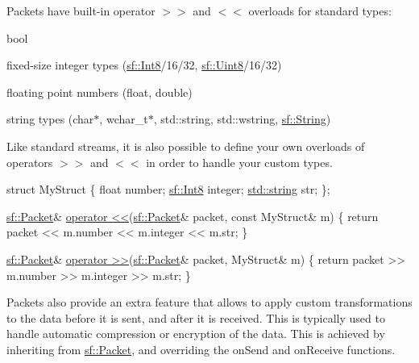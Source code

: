 Packets have built-\/in operator $>$$>$ and $<$$<$ overloads for standard types\-: \begin{DoxyItemize}
\item bool \item fixed-\/size integer types (\hyperlink{namespacesf_a69b109973eac74e22b97e5339bdb68dd}{sf\-::\-Int8}/16/32, \hyperlink{namespacesf_a4ef3d630785c4f296f9b4f274c33d78e}{sf\-::\-Uint8}/16/32) \item floating point numbers (float, double) \item string types (char$\ast$, wchar\-\_\-t$\ast$, std\-::string, std\-::wstring, \hyperlink{classsf_1_1_string}{sf\-::\-String})\end{DoxyItemize}
Like standard streams, it is also possible to define your own overloads of operators $>$$>$ and $<$$<$ in order to handle your custom types.


\begin{DoxyCode}
\textcolor{keyword}{struct }MyStruct
\{
    \textcolor{keywordtype}{float}       number;
    \hyperlink{namespacesf_a69b109973eac74e22b97e5339bdb68dd}{sf::Int8}    integer;
    \hyperlink{gl3_8h_ac83513893df92266f79a515488701770}{std::string} str;
\};

\hyperlink{classsf_1_1_packet}{sf::Packet}& \hyperlink{classsf_1_1_packet_aa5a465ed02ba29d83ecdafb0ac3fff21}{operator <<}(\hyperlink{classsf_1_1_packet}{sf::Packet}& packet, \textcolor{keyword}{const} MyStruct& m)
\{
    \textcolor{keywordflow}{return} packet << m.number << m.integer << m.str;
\}

\hyperlink{classsf_1_1_packet}{sf::Packet}& \hyperlink{classsf_1_1_packet_af8e26c63ba9bdccd262565ff0d3eeba2}{operator >>}(\hyperlink{classsf_1_1_packet}{sf::Packet}& packet, MyStruct& m)
\{
    \textcolor{keywordflow}{return} packet >> m.number >> m.integer >> m.str;
\}
\end{DoxyCode}


Packets also provide an extra feature that allows to apply custom transformations to the data before it is sent, and after it is received. This is typically used to handle automatic compression or encryption of the data. This is achieved by inheriting from \hyperlink{classsf_1_1_packet}{sf\-::\-Packet}, and overriding the on\-Send and on\-Receive functions.

